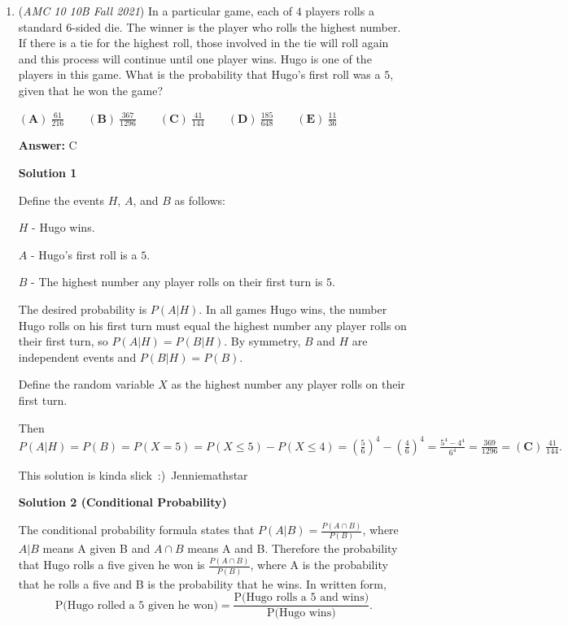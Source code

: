 \begin{enumerate}
 


 


	\item (\textit{AMC 10 10B Fall 2021}) In a particular game, each of $4$ players rolls a standard $6{ }$-sided die. The winner is the player who rolls the highest number. If there is a tie for the highest roll, those involved in the tie will roll again and this process will continue until one player wins. Hugo is one of the players in this game. What is the probability that Hugo's first roll was a $5,$ given that he won the game?


 $(\textbf{A})\: \frac{61}{216}\qquad(\textbf{B}) \: \frac{367}{1296}\qquad(\textbf{C}) \: \frac{41}{144}\qquad(\textbf{D}) \: \frac{185}{648}\qquad(\textbf{E}) \: \frac{11}{36}$

 \textbf{Answer: }C



\textbf{Solution 1}

Define the events $H$, $A$, and $B$ as follows:

 $H$ - Hugo wins.

 $A$ - Hugo's first roll is a $5$.

 $B$ - The highest number any player rolls on their first turn is $5$.

 The desired probability is $P(A|H)$.  In all games Hugo wins, the number Hugo rolls on his first turn must equal the highest number any player rolls on their first turn, so $P(A|H) = P(B|H)$.  By symmetry, $B$ and $H$ are independent events and $P(B|H) = P(B)$.  

 Define the random variable $X$ as the highest number any player rolls on their first turn.  

 Then $P(A|H) = P(B) = P(X = 5) = P(X \leq 5) - P(X \leq 4) = \left(\frac56\right)^4-\left(\frac46\right)^4=\frac{5^4-4^4}{6^4}=\frac{369}{1296}=\boxed{(\textbf{C}) \: \frac{41}{144}}.$

 This solution is kinda slick :)~Jenniemathstar

 



\textbf{Solution 2 (Conditional Probability)}

The conditional probability formula states that $P(A|B) = \frac{P(A\cap B)}{P(B)}$, where $A|B$ means A given B and $A\cap B$ means A and B. Therefore the probability that Hugo rolls a five given he won is $\frac{P(A \cap B)}{P(B)}$, where A is the probability that he rolls a five and B is the probability that he wins. In written form, 
 \[\text{P(Hugo rolled a 5 given he won)}=\frac{\text{P(Hugo rolls a 5 and wins)}}{\text{P(Hugo wins)}}.\]


\end{enumerate}

